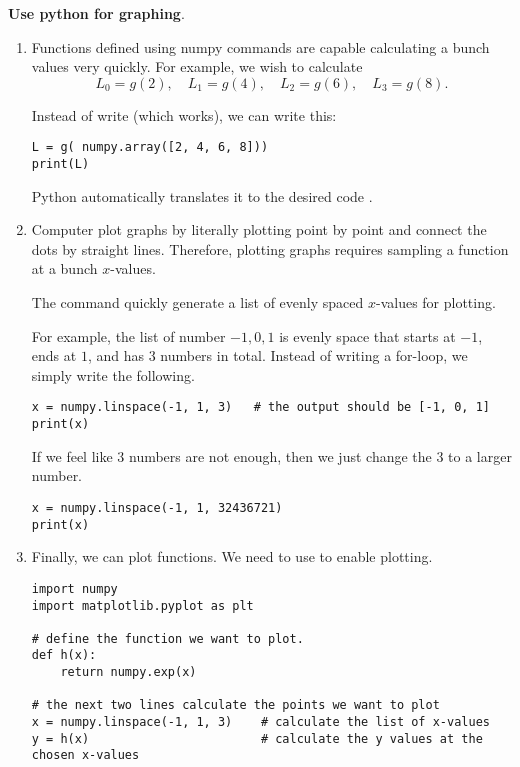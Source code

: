 \documentclass[../main.tex]{subfiles}
\begin{document}
\textbf{Use python for graphing}.  

\begin{enumerate}
  \item Functions defined using numpy commands are capable calculating a bunch values very quickly.  For example, we wish to calculate
    \[
      L_{0} = g(2), \quad L_{1} = g(4), \quad L_{2} = g(6), \quad L_{3} = g(8).
    \]

    Instead of write  (which works), we can write this:
    \begin{verbatim}
L = g( numpy.array([2, 4, 6, 8]))
print(L)
    \end{verbatim}
    Python automatically translates it to the desired code .

  \item Computer plot graphs by literally plotting point by point and connect the dots by straight lines.  Therefore, plotting graphs requires sampling a function at a bunch \(x\)-values. 

    The command  quickly generate a list of evenly spaced \(x\)-values for plotting.

    For example, the list of number \(-1, 0, 1\) is evenly space that starts at \(-1\), ends at \(1\), and has \(3\) numbers in total.  Instead of writing a for-loop, we simply write the following.
    \begin{verbatim}
x = numpy.linspace(-1, 1, 3)   # the output should be [-1, 0, 1]
print(x)
    \end{verbatim}
    
    If we feel like \(3\) numbers are not enough, then we just change the \(3\) to a larger number.
    \begin{verbatim}
x = numpy.linspace(-1, 1, 32436721)
print(x)
    \end{verbatim}

  \item Finally, we can plot functions.   We need to use  to enable plotting. 

    \begin{verbatim}
import numpy
import matplotlib.pyplot as plt

# define the function we want to plot.
def h(x):
    return numpy.exp(x)

# the next two lines calculate the points we want to plot
x = numpy.linspace(-1, 1, 3)    # calculate the list of x-values
y = h(x)                        # calculate the y values at the chosen x-values


\end{verbatim}
\end{enumerate}
\end{document}
